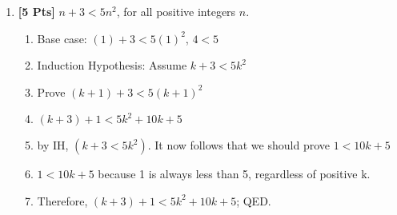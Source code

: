     \begin{enumerate}

        \item {\bf [5 Pts]} $n+3 < 5n^2$, for all positive integers $n$.
        \begin{enumerate}
            \item Base case: $(1) + 3 < 5(1)^2$, $4 < 5$
            \item Induction Hypothesis: Assume $k + 3 < 5k^2$
            \item Prove $(k + 1) + 3 < 5(k+1)^2$
            \item $(k + 3) + 1 < 5k^2 + 10k + 5$
            \item by IH, $(k + 3 < 5k^2)$. It now follows that we should prove $1 < 10k + 5$
            \item $1 < 10k + 5$ because 1 is always less than 5, regardless of positive k.
            \item Therefore, $(k + 3) + 1 < 5k^2 + 10k + 5$; QED.
        \end{enumerate}


\end{enumerate}
